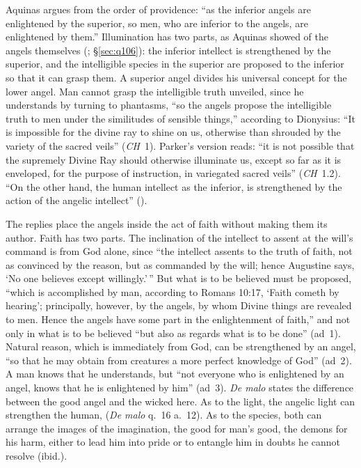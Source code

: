 Aquinas argues from the order of providence: ``as the inferior angels are
enlightened by the superior, so men, who are inferior to the angels, are
enlightened by them.'' Illumination has two parts, as Aquinas showed of
the angels themselves (; \S\ref{sec:q106}): the inferior intellect is
strengthened by the superior, and the intelligible species in the superior
are proposed to the inferior so that it can grasp them. A superior angel
divides his universal concept for the lower angel. Man cannot grasp the
intelligible truth unveiled, since he understands by turning to phantasms,
``so the angels propose the intelligible truth to men under the
similitudes of sensible things,'' according to Dionysius: ``It is
impossible for the divine ray to shine on us, otherwise than shrouded by
the variety of the sacred veils'' (\emph{CH}~1). Parker's version reads:
``it is not possible that the supremely Divine Ray should otherwise
illuminate us, except so far as it is enveloped, for the purpose of
instruction, in variegated sacred veils'' (\emph{CH}~1.2). ``On the other
hand, the human intellect as the inferior, is strengthened by the action
of the angelic intellect'' ().

The replies place the angels inside the act of faith without making them
its author. Faith has two parts. The inclination of the intellect to
assent at the will's command is from God alone, since ``the intellect
assents to the truth of faith, not as convinced by the reason, but as
commanded by the will; hence Augustine says, `No one believes except
willingly.'\,'' But what is to be believed must be proposed, ``which is
accomplished by man, according to Romans 10:17, `Faith cometh by hearing';
principally, however, by the angels, by whom Divine things are revealed to
men. Hence the angels have some part in the enlightenment of faith,'' and
not only in what is to be believed ``but also as regards what is to be
done'' (ad~1). Natural reason, which is immediately from God, can be
strengthened by an angel, ``so that he may obtain from creatures a more
perfect knowledge of God'' (ad~2). A man knows that he understands, but
``not everyone who is enlightened by an angel, knows that he is enlightened
by him'' (ad~3). \emph{De malo} states the difference between the good angel
and the wicked here. As to the light, the angelic light can strengthen the
human, 
(\emph{De malo} q.~16 a.~12). As to the species, both can arrange the
images of the imagination, the good for man's good, the demons for his
harm, either to lead him into pride or to entangle him in doubts he cannot
resolve (ibid.).

